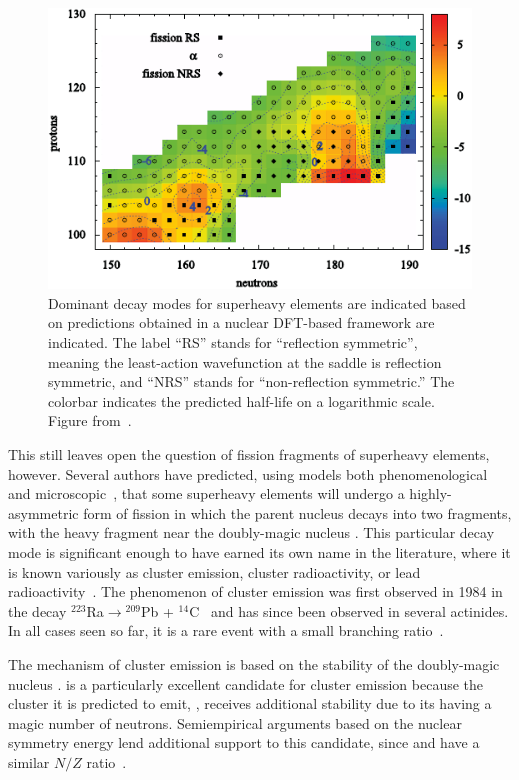 \begin{figure}
	\centering
	\includegraphics[width=0.7\linewidth]{TeX_files/294Og_Warda2012_SHE}
	\caption[Dominant decay modes for superheavy elements are indicated based on predictions obtained in a nuclear DFT-based framework.]{Dominant decay modes for superheavy elements are indicated based on predictions obtained in a nuclear DFT-based framework are indicated. The label ``RS'' stands for ``reflection symmetric'', meaning the least-action wavefunction at the saddle is reflection symmetric, and ``NRS'' stands for ``non-reflection symmetric.'' The colorbar indicates the predicted half-life on a logarithmic scale. Figure from~\cite{Warda2012}.}
	\label{fig:warda2012she}
\end{figure}

This still leaves open the question of fission fragments of superheavy elements, however. Several authors have predicted, using models both phenomenological~\cite{Poenaru2011, Poenaru2012, Poenaru2013, Poenaru2015, Poenaru2018,Santhosh2018, Zhang2018} and microscopic~\cite{Warda2018}, that some superheavy elements will undergo a highly-asymmetric form of fission in which the parent nucleus decays into two fragments, with the heavy fragment near the doubly-magic nucleus {\Pb}. This particular decay mode is significant enough to have earned its own name in the literature, where it is known variously as cluster emission, cluster radioactivity, or lead radioactivity~\cite{Sandulescu1980,Poenaru1986,Royer1998,Poenaru2010,Warda2011}. The phenomenon of cluster emission was first observed in 1984 in the decay $^{223}$Ra$\rightarrow$$^{209}$Pb + $^{14}$C~\cite{Rose1984} and has since been observed in several actinides. In all cases seen so far, it is a rare event with a small branching ratio~\cite{Poenaru2010}.

The mechanism of cluster emission is based on the stability of the doubly-magic nucleus {\Pb}. {\Og} is a particularly excellent candidate for cluster emission because the cluster it is predicted to emit, {\Kr}, receives additional stability due to its having a magic number of neutrons.  Semiempirical arguments based on the nuclear symmetry energy lend additional support to this candidate, since {\Og} and {\Pb} have a similar $N/Z$ ratio~\cite{Warda2018}.


